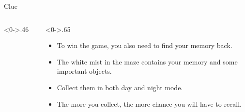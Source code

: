 \documentclass[notheorems]{beamer}
\begin{document}
\begin{framenl}{Clue}
\begin{columns}[T] %
\begin{column}<0->{.46\textwidth}
\begin{figure}[thpb]
\centering
{}

\end{figure}
\end{column}%
\hfill%
\begin{column}<0->{.65\textwidth}
\begin{itemize}
\item<1-> To win the game, you also need to find your memory back.
\item<2-> The white mist in the maze contains your memory and some important objects.
\item<3-> Collect them in both day and night mode.
\item <4-> The more you collect, the more chance you will have to recall.
\end{itemize}
\end{column}%
\end{columns}
\end{framenl}
\end{document}

